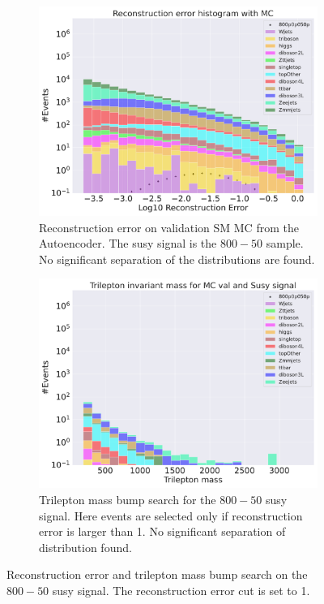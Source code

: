 \begin{figure}[h!]
    \centering
    \begin{subfigure}{.8\textwidth}
        \includegraphics[width=\textwidth]{Figures/AE_testing/small/b_data_recon_big_rm3_feats_sig_800p0p050p.pdf}
        \caption{Reconstruction error on validation SM MC from the Autoencoder. The susy signal is the $800-50$ sample. 
        No significant separation of the distributions are found. }
        \label{fig:ae_susy_800_50_recon}
    \end{subfigure}
    \hfill
    \begin{subfigure}{.8\textwidth}
        \includegraphics[width=\textwidth]{Figures/AE_testing/small/b_data_recon_big_rm3_feats_sig_800p0p050p_Trilepton mass.pdf}
        \caption{Trilepton mass bump search for the $800-50$ susy signal. Here events are selected only if reconstruction error is larger than 1. No significant 
        separation of distribution found.}
        \label{fig:ae_susy_800_50_trilep}
    \end{subfigure} 
    \hfill        
    \caption{Reconstruction error and trilepton mass bump search on the $800-50$ susy signal. The reconstruction error cut is set to 1. }
    \label{fig:ae_susy_800_50_recon_trilep}
\end{figure}


